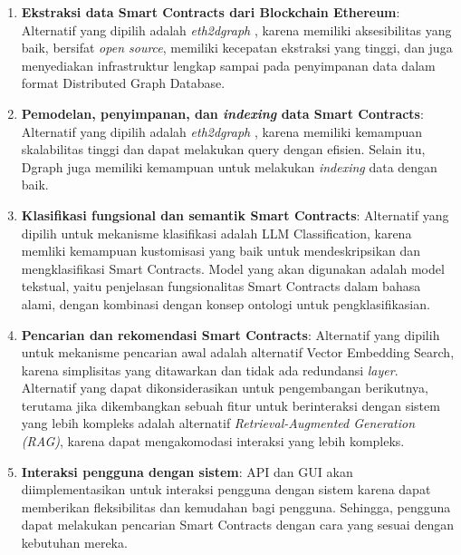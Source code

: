\begin{enumerate}
	\item \textbf{Ekstraksi data Smart Contracts dari Blockchain Ethereum}: Alternatif yang dipilih adalah \textit{eth2dgraph} \parencite{aimar2023extraction}, karena memiliki aksesibilitas yang baik, bersifat \textit{open source}, memiliki kecepatan ekstraksi yang tinggi, dan juga menyediakan infrastruktur lengkap sampai pada penyimpanan data dalam format Distributed Graph Database.
	\item \textbf{Pemodelan, penyimpanan, dan \textit{indexing} data Smart Contracts}: Alternatif yang dipilih adalah \textit{eth2dgraph} \parencite{aimar2023extraction}, karena memiliki kemampuan skalabilitas tinggi dan dapat melakukan query dengan efisien. Selain itu, Dgraph juga memiliki kemampuan untuk melakukan \textit{indexing} data dengan baik.
	\item \textbf{Klasifikasi fungsional dan semantik Smart Contracts}: Alternatif yang dipilih untuk mekanisme klasifikasi adalah LLM Classification, karena memliki kemampuan kustomisasi yang baik untuk mendeskripsikan dan mengklasifikasi Smart Contracts. Model yang akan digunakan adalah model tekstual, yaitu penjelasan fungsionalitas Smart Contracts dalam bahasa alami, dengan kombinasi dengan konsep ontologi untuk pengklasifikasian.
	\item \textbf{Pencarian dan rekomendasi Smart Contracts}: Alternatif yang dipilih untuk mekanisme pencarian awal adalah alternatif Vector Embedding Search, karena simplisitas yang ditawarkan dan tidak ada redundansi \textit{layer}. Alternatif yang dapat dikonsiderasikan untuk pengembangan berikutnya, terutama jika dikembangkan sebuah fitur untuk berinteraksi dengan sistem yang lebih kompleks adalah alternatif \textit{Retrieval-Augmented Generation (RAG)}, karena dapat mengakomodasi interaksi yang lebih kompleks.
	\item \textbf{Interaksi pengguna dengan sistem}: API dan GUI akan diimplementasikan untuk interaksi pengguna dengan sistem karena dapat memberikan fleksibilitas dan kemudahan bagi pengguna. Sehingga, pengguna dapat melakukan pencarian Smart Contracts dengan cara yang sesuai dengan kebutuhan mereka.
\end{enumerate}